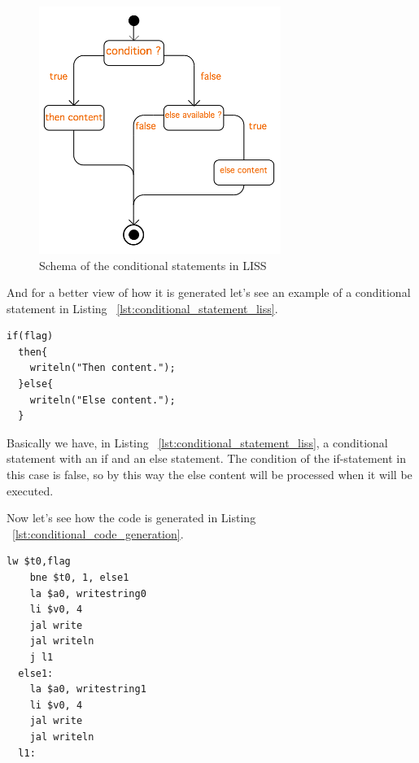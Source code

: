 \documentclass[
  oneside,
  11pt, a4paper,
  footinclude=true,
  headinclude=true,
  cleardoublepage=empty
]{scrbook}
\begin{document}
\begin{figure}[h!]
  \centering
    \includegraphics[width=0.7\textwidth]{img/conditional_statement.png}
    \caption{Schema of the conditional statements in LISS}
    \label{fig:conditional_figure}
\end{figure}

And for a better view of how it is generated let's see an example of a conditional statement in Listing ~\ref{lst:conditional_statement_liss}.

\begin{lstlisting}[caption={Example of conditional statement in LISS},label={lst:conditional_statement_liss}]
  if(flag)
  then{
    writeln("Then content.");
  }else{
    writeln("Else content.");
  }
\end{lstlisting}

Basically we have, in Listing ~\ref{lst:conditional_statement_liss}, a conditional statement with an if and an else statement. The condition of the if-statement  in this case is false, so by this way the else content will be processed when it will be executed.

Now let's see how the code is generated in Listing ~\ref{lst:conditional_code_generation}.

\begin{lstlisting}[caption={Code generated for conditional statement in MIPS},label={lst:conditional_code_generation}]
    lw $t0,flag		
    bne $t0, 1, else1		
    la $a0, writestring0
    li $v0, 4
    jal write		
    jal writeln		
    j l1		
  else1:		
    la $a0, writestring1
    li $v0, 4
    jal write		
    jal writeln		
  l1:		
\end{lstlisting}
\end{document}

